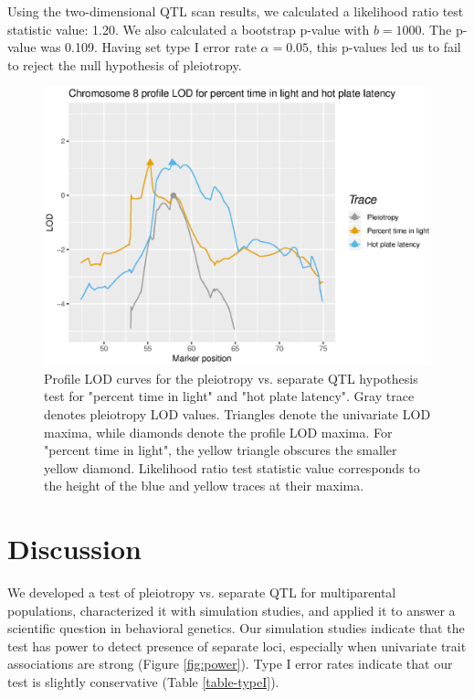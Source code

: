 \documentclass[12pt,twoside, lineno]{gsajnl}
\begin{document}
Using the two-dimensional QTL scan results, we calculated a likelihood
ratio test statistic value: 1.20. We also calculated a bootstrap
p-value with $b = 1000$. The p-value was 0.109. Having set type I
error rate $\alpha = 0.05$, this p-values led us to fail to reject the
null hypothesis of pleiotropy.


\begin{figure}
\includegraphics[width = \textwidth]{../Rmd/profile.eps}
\caption{Profile LOD curves for the pleiotropy vs. separate QTL
  hypothesis test for "percent time in light" and "hot plate latency".
  Gray trace denotes pleiotropy LOD values. Triangles denote the
  univariate LOD maxima, while diamonds denote the profile LOD maxima.
  For "percent time in light", the yellow triangle obscures the
  smaller yellow diamond. Likelihood ratio test statistic value
  corresponds to the height of the blue and yellow traces at their
  maxima.}
\label{fig:profiles}
\end{figure}








\section{Discussion}

We developed a test of pleiotropy vs. separate QTL for multiparental
populations, characterized it with simulation studies, and applied it
to answer a scientific question in behavioral genetics. Our simulation
studies indicate that the test has power to detect presence of
separate loci, especially when univariate trait associations are
strong (Figure \ref{fig:power}). Type I error rates indicate that our
test is slightly conservative (Table \ref{table-typeI}).
\end{document}
